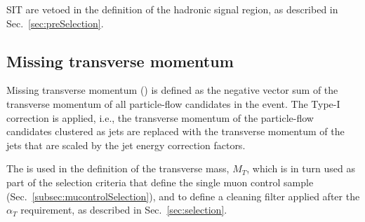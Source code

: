 SIT are vetoed in the definition of the hadronic signal region, 
as described in Sec.~\ref{sec:preSelection}.


\subsection{Missing transverse momentum}
Missing transverse momentum (\met) is defined as the negative vector sum
of the transverse momentum of all particle-flow candidates in the event.
The Type-I \met correction \cite{Khachatryan:2014gga} is applied, i.e., the transverse momentum of
the particle-flow candidates clustered as jets are replaced with the
transverse momentum of the jets that are scaled by the jet energy
correction factors.

The \met is used in the definition of 
the transverse mass, $M_{T}$, which is in turn used as part of
the selection criteria that define the single muon control sample 
(Sec.~\ref{subsec:mucontrolSelection}), and to define a cleaning filter applied after the
$\alpha_{T}$ requirement, as described in Sec.~\ref{sec:selection}.



